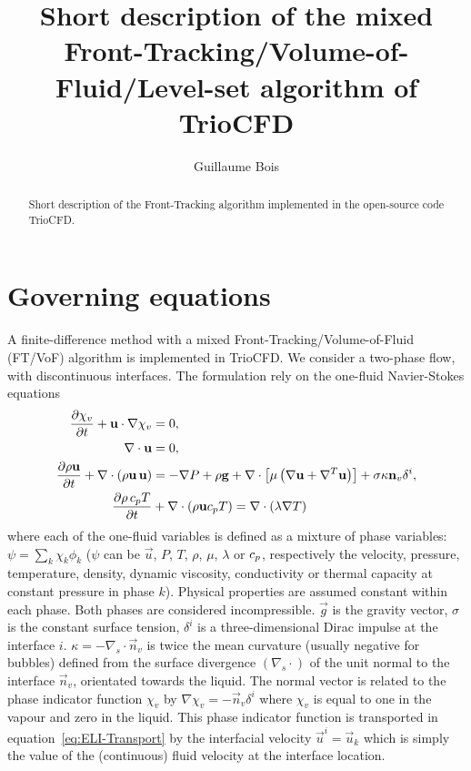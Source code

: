 \documentclass[]{article}
\title{Short description of the mixed Front-Tracking/Volume-of-Fluid/Level-set algorithm of TrioCFD}
\author{Guillaume Bois}%
\date{}
\begin{document}
	
\maketitle
	
\begin{abstract}
	Short description of the Front-Tracking algorithm implemented in the open-source code TrioCFD.
\end{abstract}

\section{Governing equations}
A finite-difference method with a mixed Front-Tracking/Volume-of-Fluid (FT/VoF) algorithm is implemented in TrioCFD.
We consider a two-phase flow, with discontinuous interfaces.  
The formulation rely on the one-fluid Navier-Stokes equations \parencite{Kataoka1986,Bunner2003} 
\begin{align}
 \frac{\partial \chi_v}{\partial t} + \mathbf{u} \cdot \nabla \chi_v &= 0, \label{eq:ELI-Transport} \\
 \nabla\cdot\mathbf{u}&=0, \label{eq:ELI-masse}\\
 \frac{\partial \rho \mathbf{u}}{\partial t} + \nabla \cdot \left( \rho \mathbf{u} \, \mathbf{u}\right) &= -\nabla P + \rho \mathbf{g} + \nabla \cdot \left[ \mu \left( \nabla \mathbf{u}+\nabla^T \mathbf{u}\right)\right] 
+ \sigma \kappa \mathbf{n}_v \delta^i, \label{eq:ELI-QdM} \\
 \frac{\partial {\rho \, c_pT}}{\partial t} &+ \nabla \cdot \left( \rho \mathbf{u} c_p T\right) = \nabla \cdot \left( \lambda \nabla T\right) \label{eq:ELI-T}
\end{align}
where each of the one-fluid variables is defined as a mixture of phase variables: ${\psi=\sum_k\chi_k\phi_k}$ 
{($\psi$ can be $\vec{u}$, $P$, $T$, $\rho$, $\mu$, $\lambda$ or $c_p$, respectively the velocity, pressure, 
	temperature, density, dynamic viscosity, conductivity or thermal capacity at constant pressure in phase $k$)}. 
Physical properties are assumed constant within each phase. Both phases are considered incompressible. $\vec{g}$ 
is the gravity vector, $\sigma$ is the constant surface tension, $\delta^i$ is a three-dimensional Dirac 
impulse at the interface {$i$}. $\kappa=-\nabla_s \cdot \vec{n}_v$ is twice the mean curvature (usually negative 
for bubbles) defined from the surface divergence $(\nabla_s \cdot)$ of the unit normal to the interface $\vec{n}_v$, 
orientated towards the liquid. The normal vector is related to the phase indicator function $\chi_v$ by 
$\nabla\chi_v=-\vec{n}_v\delta^i$ where $\chi_v$ is equal to one in the vapour and zero in the liquid. This phase indicator function is transported in equation~\eqref{eq:ELI-Transport} by the interfacial velocity $\vec{u}^i =\vec{u}_k$ which is simply the value of the (continuous) fluid velocity at the interface location.
\end{document}
